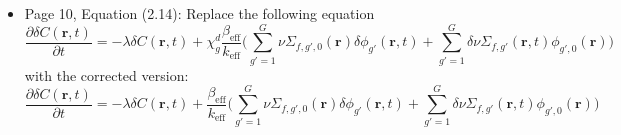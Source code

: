 \documentclass[12pt]{article}
\begin{document}
\begin{itemize}
    \item Page 10, Equation (2.14): Replace the  following equation
    \begin{equation*}
        \frac{\partial \delta C(\textbf{r}, t)}{\partial t} = - \lambda \delta C(\textbf{r}, t) + \chi^d_g \frac{\beta_{\text{eff}}}{k_{\text{eff}}}\biggl(\sum_{g' = 1}^{G} \nu \Sigma_{f,g',0}(\textbf{r}) \delta \phi_{g'}(\textbf{r}, t) + \sum_{g' = 1}^{G} \delta \nu \Sigma_{f,g'}(\textbf{r}, t) \phi_{g',0}(\textbf{r}) \biggr)
    \end{equation*}
    with the corrected version:
\begin{equation*}
        \frac{\partial \delta C(\textbf{r}, t)}{\partial t} = - \lambda \delta C(\textbf{r}, t) + \frac{\beta_{\text{eff}}}{k_{\text{eff}}}\biggl(\sum_{g' = 1}^{G} \nu \Sigma_{f,g',0}(\textbf{r}) \delta \phi_{g'}(\textbf{r}, t) + \sum_{g' = 1}^{G} \delta \nu \Sigma_{f,g'}(\textbf{r}, t) \phi_{g',0}(\textbf{r}) \biggr)
\end{equation*}


\end{itemize}
\end{document}
